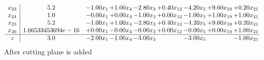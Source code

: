 \documentclass[8pt]{article}
\begin{document}
\[\begin{array}{c| c c@{\hskip 2pt} c@{\hskip 2pt} c@{\hskip 2pt} c@{\hskip 2pt} c@{\hskip 2pt} c@{\hskip 2pt} c@{\hskip 2pt} }
 x_{23}   &  5.2 & -1.00 x_{1} & +  1.00 x_{4} & -2.80 x_{3} & +  0.40 x_{12} & -4.20 x_{5} & +  9.60 x_{19} & +  0.20 x_{21}\\
 x_{24}   &  1.0 & -0.00 x_{1} & +  0.00 x_{4} & -1.00 x_{3} & +  0.00 x_{12} & -1.00 x_{5} & +  1.00 x_{19} & +  1.00 x_{21}\\
 x_{25}   &  5.2 & -1.00 x_{1} & +  1.00 x_{4} & -2.80 x_{3} & +  0.40 x_{12} & -4.20 x_{5} & +  9.60 x_{19} & +  0.20 x_{21}\\
 x_{26}   &  1.66533453694e-16 & +  0.00 x_{1} & -0.00 x_{4} & -0.00 x_{3} & +  0.00 x_{12} & -0.00 x_{5} & +  0.00 x_{19} & +  1.00 x_{21}\\
\hline
z    &  3.0 & -2.00 x_{1} & -1.00 x_{4} & -3.00 x_{3} &   & -3.00 x_{5} &   & -1.00 x_{21}\\
\end{array}\]
 After cutting plane is added 
\end{document}
